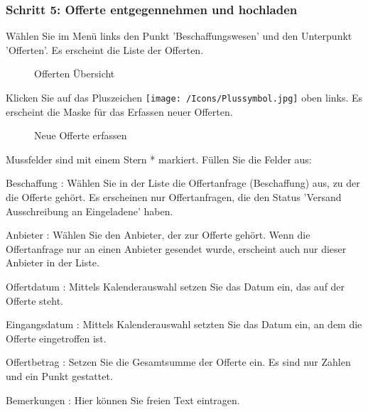 \subsubsection{Schritt 5: Offerte entgegennehmen und hochladen}

Wählen Sie im Menü links den Punkt 'Beschaffungswesen' und den Unterpunkt 'Offerten'. Es erscheint die Liste der Offerten.

\begin{figure}[H]
\caption{Offerten Übersicht}
\end{figure}

Klicken Sie auf das Pluszeichen \texttt{[image: /Icons/Plussymbol.jpg]}  oben links. Es erscheint die Maske für das Erfassen neuer Offerten.

\begin{figure}[H]
\caption{Neue Offerte erfassen}
\end{figure}


Mussfelder sind mit einem Stern * markiert. Füllen Sie die Felder aus:

\vspace{\baselineskip}

\begin{compactitem}
\item
Beschaffung : Wählen Sie in der Liste die Offertanfrage (Beschaffung) aus, zu der die Offerte gehört. Es erscheinen nur Offertanfragen, die den Status 'Versand Ausschreibung an Eingeladene' haben.
\item
Anbieter : Wählen Sie den Anbieter, der zur Offerte gehört. Wenn die Offertanfrage nur an einen Anbieter gesendet wurde, erscheint auch nur dieser Anbieter in der Liste.
\item
Offertdatum : Mittels Kalenderauswahl setzen Sie das Datum ein, das auf der Offerte steht.
\item
Eingangsdatum : Mittels Kalenderauswahl setzten Sie das Datum ein, an dem die Offerte eingetroffen ist.
\item
Offertbetrag : Setzen Sie die Gesamtsumme der Offerte ein. Es sind nur Zahlen und ein Punkt gestattet.
\item
Bemerkungen : Hier können Sie freien Text eintragen.
\end{compactitem}

\vspace{\baselineskip}

